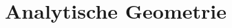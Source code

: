 \renewcommand{\subdir}{AnalytischeGeometrie/}

\ifproblem
\section{Analytische Geometrie}
\fi








